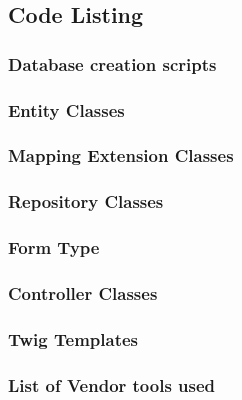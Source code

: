 \documentclass[a4paper]{article}
\begin{document}
\subsection {Code Listing}

\subsubsection {Database creation scripts}
\subsubsection {Entity Classes}
\subsubsection {Mapping Extension Classes}
\subsubsection {Repository Classes}
\subsubsection {Form Type}
\subsubsection {Controller Classes}
\subsubsection {Twig Templates}
\subsubsection {List of Vendor tools used}
\end{document}
